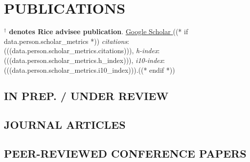 
\section{PUBLICATIONS}

{\textcolor{RiceBlue}{\textbf{$^\mathbf{\dagger}$ denotes Rice advisee publication}}}.
\href{https://scholar.google.com/citations?user=(((data.person.googlescholar)))}{Google Scholar \aiGoogleScholar}((* if data.person.scholar_metrics *)) \textit{citations}: (((data.person.scholar_metrics.citations))), \textit{h-index}: (((data.person.scholar_metrics.h_index))), \textit{i10-index}: (((data.person.scholar_metrics.i10_index))).((* endif *))
\medskip


\subsection{IN PREP. / UNDER REVIEW}

\setcounter{bibitemcount}{0}
\printbibliography[filter=ispreprint, heading=none, env=hanging]

\subsection{JOURNAL ARTICLES}

\setcounter{bibitemcount}{0}
\printbibliography[heading=none, type=article, env=hanging]

\subsection{PEER-REVIEWED CONFERENCE PAPERS}

\setcounter{bibitemcount}{0}
\printbibliography[heading=none, type=inproceedings, env=hanging]

